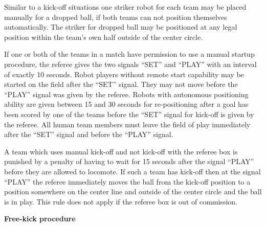 Similar to a kick-off situations one striker robot for each team may be placed manually for a dropped ball, if both teams can not position themselves automatically. The striker for dropped ball may be positioned at any legal position within the team's own half outside of the center circle.

\bigskip

If one or both of the teams in a match have permission to use a manual startup procedure, the referee gives the two signals ``SET'' and ``PLAY'' with an interval of exactly
10 seconds. Robot players without remote start capability may be started on the field after the ``SET'' signal. They may not move before the ``PLAY'' signal was given
by the referee. Robots with autonomous positioning ability are given between 15 and 30 seconds for re-positioning after a goal has been scored by one of the teams before the ``SET'' signal for kick-off is given by the referee. All human team members must leave the field of play
immediately after the ``SET'' signal and before the ``PLAY'' signal.

A team which uses manual kick-off and not kick-off with the referee box is punished by a penalty of having to wait for 15 seconds after the signal ``PLAY'' before they are
allowed to locomote. If such a team has kick-off then at the signal ``PLAY'' the referee immediately moves the ball from the kick-off position to a position somewhere on
the center line and outside of the center circle and the ball is in play. This rule does not apply if the referee box is out of commission.

\bigskip


{\bfseries Free-kick procedure}


